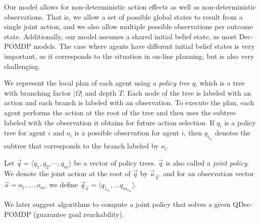\documentclass[letterpaper]{article}
\theoremstyle{definition}
\begin{document}
Our model allows for non-deterministic action effects as well as non-deterministic observations. That is, we allow a set of possible global states to result from a single joint action, and we also allow multiple possible observations per outcome state.
Additionally, our model assumes a shared initial belief state, as most Dec-POMDP models. The case where agents have different initial belief states is very important, as it corresponds to the situation in on-line planning, but is also very challenging.

We represent the local plan of each agent using a \emph{policy tree} $q$, which is a tree with branching factor $|\Omega|$ and depth $T$.  Each node of the tree is labeled with an action and each branch is labeled with an observation.  To execute the plan, each agent performs the action at the root of the tree and then uses the subtree labeled with the observation it obtains for future action selection.
If $q_i$ is a policy tree for agent $i$ and $o_i$ is a possible observation for agent $i$, then $q_{i_{o_i}}$ denotes the subtree that corresponds to the branch labeled by $o_i$.

Let $\vec{q} = \langle  q_1, q_2, \cdots, q_m \rangle$ be a vector of policy trees.  $\vec{q}$ is also called a {\em joint policy}.
We denote the joint action at the root of $\vec{q}$ by $\vec{a}_{\vec{q}}$, and for an observation vector
$\vec{o}=o_1,\ldots, o_m$, we define $\vec{q}_{\vec{o}}= \langle  q_{1_{o_1}},\ldots q_{m_{o_m}}\rangle$.

We later suggest algorithms to compute a joint policy that solves a given QDec-POMDP (guarantee goal reachability).
\end{document}
